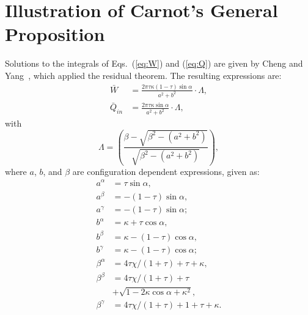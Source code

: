 \section{Illustration of Carnot's General Proposition}

    Solutions to the integrals of Eqs.~(\ref{eq:W}) and (\ref{eq:Q})  are  given  by  Cheng  and
    Yang~\cite{2012-ChengCH+YangHS-ApEnergy}, which applied the residual theorem. The  resulting
    expressions are:
    \begin{align}
        \label{eq:Ws}
        \bar{W} &= \frac{2\pi\tau\kappa(1 - \tau)\sin\alpha}{a^2 + b^2}\cdot\Lambda,\\
        \label{eq:Qs}
        \bar{Q}_{in} &= \frac{2\pi\tau\kappa\sin\alpha}{a^2 + b^2}\cdot\Lambda,
    \end{align}
    \noindent with
    \begin{equation}
        \label{eq:Lamda}
        \Lambda = \left(
                \frac{\beta - \sqrt{\beta^2 - (a^2 + b^2)}}{\sqrt{\beta^2 - (a^2 + b^2)}}
            \right),
    \end{equation}
    \noindent where $a$, $b$, and $\beta$ are configuration dependent expressions, given as:
    \begin{align}
        \label{eq:aa}
        a^{\alpha}  &= \tau\sin\alpha,\\
        \label{eq:ab}
        a^{\beta}   &= -(1 - \tau)\sin\alpha,\\
        \label{eq:ag}
        a^{\gamma}  &= -(1 - \tau)\sin\alpha;\\
        \label{eq:ba}
        b^{\alpha}  &= \kappa + \tau\cos\alpha,\\
        \label{eq:bb}
        b^{\beta}   &= \kappa - (1 - \tau)\cos\alpha,\\
        \label{eq:bg}
        b^{\gamma}  &= \kappa - (1 - \tau)\cos\alpha;\\
        \label{eq:betaa}
        \beta^{\alpha}  &= 4\tau\chi/(1 + \tau) + \tau + \kappa,\\
        \label{eq:betab}
        \beta^{\beta}   &= 4\tau\chi/(1 + \tau) + \tau \nonumber\\
                        &+ \sqrt{1 - 2\kappa\cos\alpha + \kappa^2},\\
        \label{eq:betag}
        \beta^{\gamma}  &= 4\tau\chi/(1 + \tau) + 1 + \tau + \kappa.
    \end{align}

